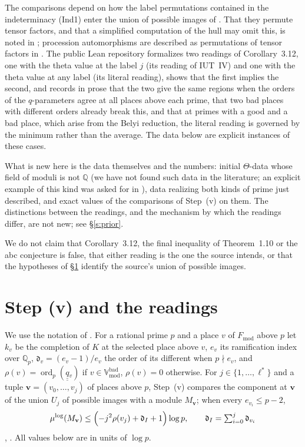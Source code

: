 \documentclass[11pt]{amsart}
\theoremstyle{remark}
\newcommand{\Q}{\mathbb Q}
\newcommand{\Qp}{\mathbb Q_p}
\newcommand{\dd}{\mathfrak d}
\newcommand{\qq}{\underline{\underline{q}}{}}
\newcommand{\Fmod}{F_{\mathrm{mod}}}
\newcommand{\Vbadmod}{\mathbb V^{\mathrm{bad}}_{\mathrm{mod}}}
\newcommand{\mulog}{\mu^{\log}}
\newcommand{\bv}{\mathbf v}
\begin{document}
The comparisons depend on how the label permutations contained in the indeterminacy (Ind1) enter the union of
possible images of \cite[Cor.~3.12]{IUT3}. That they permute tensor factors, and that a simplified computation of the
hull may omit this, is noted in \cite[\S6.2, footnote~7]{DH}; procession automorphisms are described as permutations
of tensor factors in \cite[\S4.6]{DH1}. The public Lean repository \cite{LANAiut} formalizes two readings of
Corollary~3.12, one with the theta value at the label $j$ (its reading of IUT~IV) and one with the theta value at any
label (its literal reading), shows that the first implies the second, and records in prose that the two give the same
regions when the orders of the $q$-parameters agree at all places above each prime, that two bad places with different
orders already break this, and that at primes with a good and a bad place, which arise from the Belyi reduction, the
literal reading is governed by the minimum rather than the average. The data below are explicit instances of these
cases.

What is new here is the data themselves and the numbers: initial $\Theta$-data whose field of moduli is not $\Q$
(we have not found such data in the literature; an explicit example of this kind was asked for in \cite{MO}), data
realizing both kinds of prime just described, and exact values of the comparisons of Step~(v) on them. The
distinctions between the readings, and the mechanism by which the readings differ, are not new; see \S\ref{s:prior}.

We do not claim that Corollary~3.12, the final inequality of Theorem~1.10 or the abc conjecture is false, that either
reading is the one the source intends, or that the hypotheses of \S\ref{s:readings} identify the source's union of
possible images.

\section{Step (v) and the readings}\label{s:readings}

We use the notation of \cite[\S1]{Note}. For a rational prime $p$ and a place $v$ of $\Fmod$ above $p$ let $k_v$ be
the completion of $K$ at the selected place above $v$, $e_v$ its ramification index over $\Qp$, $\dd_v=(e_v-1)/e_v$
the order of its different when $p\nmid e_v$, and $\rho(v)=\operatorname{ord}_p(\qq_v)$ if $v\in\Vbadmod$,
$\rho(v)=0$ otherwise. For $j\in\{1,\dots,\ell^*\}$ and a tuple $\bv=(v_0,\dots,v_j)$ of places above $p$, Step~(v)
compares the component at $\bv$ of the union $U_j$ of possible images with a module $M_{\bv}$; when every $e_{v_i}\le
p-2$,
\begin{equation}\label{eq:bound}
\mulog(M_{\bv})\le\Bigl(-j^2\rho(v_j)+\dd_I+1\Bigr)\log p,\qquad \dd_I=\textstyle\sum_{i=0}^{j}\dd_{v_i}
\end{equation}
\cite[Prop.~1.4(iii), p.~13]{IUT4}, \cite[(1)]{Note}. All values below are in units of $\log p$.
\end{document}
